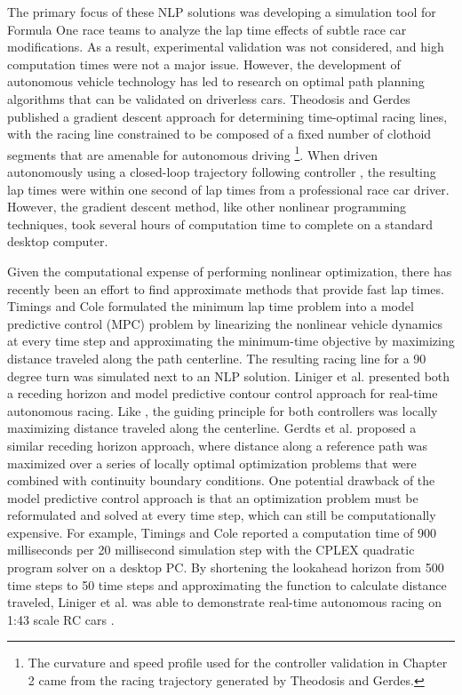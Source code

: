 The primary focus of these NLP solutions was developing a simulation tool for Formula One race teams to analyze the lap time effects of 
subtle race car modifications. As a result, experimental validation was not considered, and high computation times were not a major issue. However, the development 
of autonomous vehicle technology has led to research on optimal path
 planning algorithms that can be validated on driverless cars. Theodosis and Gerdes published a gradient descent approach 
 for determining time-optimal racing lines, with the racing line constrained to be composed of a fixed number of clothoid segments that are amenable
for autonomous driving \cite{theodosis}\footnote{The curvature and speed profile used for the controller validation in Chapter 2 came from the racing trajectory generated
 by Theodosis and Gerdes.}. When driven autonomously
  using a closed-loop trajectory following controller \cite{kapania}\cite{mickcop}, the resulting lap times were within one second of lap times from
  a professional race car driver. However, the gradient descent method, like other nonlinear programming techniques, took several hours of computation time to complete on a standard
  desktop computer. 
  
  Given the computational expense  of performing nonlinear optimization, there has recently been an effort to find
  approximate methods that provide fast lap times.
 Timings and Cole \cite{timings} formulated the minimum lap time problem into a model predictive control (MPC) problem
 by linearizing the nonlinear vehicle
 dynamics at every time step and approximating the minimum-time objective by maximizing distance traveled along the path centerline.
  The resulting racing line
 for a 90 degree turn was simulated next to an NLP solution. Liniger et al. \cite{morari} presented both a receding horizon and
 model predictive contour control approach for real-time autonomous racing. Like \cite{timings}, the guiding principle for both controllers
 was locally maximizing distance traveled along the centerline. Gerdts et al. \cite{gerdts} proposed a 
 similar receding horizon approach, where distance along a reference path was maximized over a series of locally optimal optimization
 problems that were combined with continuity boundary conditions. One potential drawback of the model predictive control approach is that an optimization
 problem must be reformulated and solved at every time step, which can still be computationally expensive. For example, Timings and Cole reported a computation time of 900 milliseconds
 per 20 millisecond simulation step with the CPLEX quadratic program solver on a desktop PC. By shortening the lookahead horizon from 500 time steps to 50 time steps and approximating
 the function to calculate distance traveled, Liniger et al. was able to demonstrate real-time autonomous racing on 1:43 scale RC cars \cite{morari}.  
 
